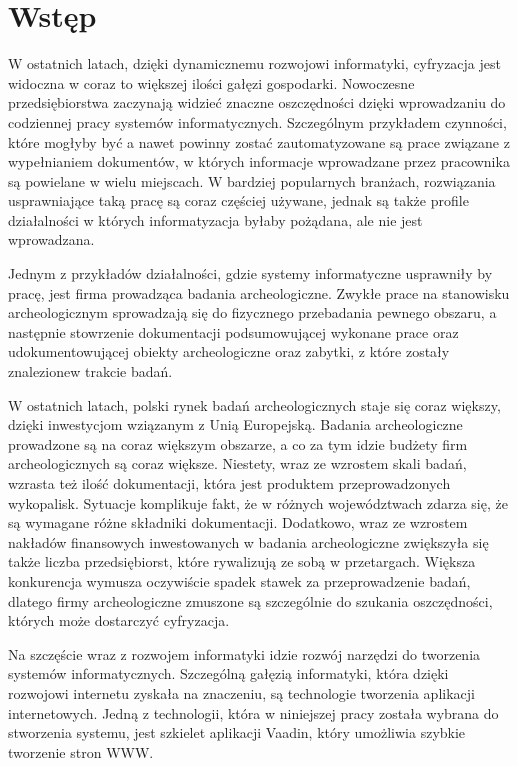\chapter{Wstęp}
W ostatnich latach, dzięki dynamicznemu rozwojowi informatyki, cyfryzacja jest widoczna w coraz to większej ilości gałęzi gospodarki. Nowoczesne przedsiębiorstwa zaczynają widzieć znaczne oszczędności dzięki wprowadzaniu do codziennej pracy systemów informatycznych. Szczególnym przykładem czynności, które mogłyby być a nawet powinny zostać zautomatyzowane są prace związane z wypełnianiem dokumentów, w których informacje wprowadzane przez pracownika są powielane w wielu miejscach. W bardziej popularnych branżach, rozwiązania usprawniające taką pracę są coraz częściej używane, jednak są także profile działalności w których informatyzacja byłaby pożądana, ale nie jest wprowadzana.

Jednym z przykładów działalności, gdzie systemy informatyczne usprawniły by pracę, jest firma prowadząca badania archeologiczne. Zwykłe prace na stanowisku archeologicznym sprowadzają się do fizycznego przebadania pewnego obszaru, a następnie stowrzenie dokumentacji podsumowującej wykonane prace oraz udokumentowującej obiekty archeologiczne oraz zabytki, z które zostały znalezionew trakcie badań.

W ostatnich latach, polski rynek badań archeologicznych staje się coraz większy, dzięki inwestycjom wziązanym z Unią Europejską. Badania archeologiczne prowadzone są na coraz większym obszarze, a co za tym idzie budżety firm archeologicznych są coraz większe. Niestety, wraz ze wzrostem skali badań, wzrasta też ilość dokumentacji, która jest produktem przeprowadzonych wykopalisk. Sytuacje komplikuje fakt, że w różnych województwach zdarza się, że są wymagane różne składniki dokumentacji. Dodatkowo, wraz ze wzrostem nakładów finansowych inwestowanych w badania archeologiczne zwiększyła się także liczba przedsiębiorst, które rywalizują ze sobą w przetargach. Większa konkurencja wymusza oczywiście spadek stawek za przeprowadzenie badań, dlatego firmy archeologiczne zmuszone są szczególnie do szukania oszczędności, których może dostarczyć cyfryzacja.

Na szczęście wraz z rozwojem informatyki idzie rozwój narzędzi do tworzenia systemów informatycznych. Szczególną gałęzią informatyki, która dzięki rozwojowi internetu zyskała na znaczeniu, są technologie tworzenia aplikacji internetowych. Jedną z technologii, która w niniejszej pracy została wybrana do stworzenia systemu, jest szkielet aplikacji Vaadin, który umożliwia szybkie tworzenie stron WWW. 
\newpage
